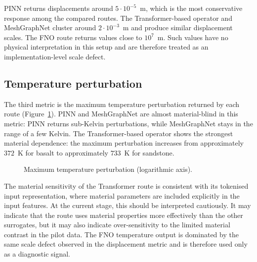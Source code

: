 PINN returns displacements around $5 \cdot 10^{-5}$~m, which is the most
conservative response among the compared routes. The Transformer-based
operator and MeshGraphNet cluster around $2 \cdot 10^{-3}$~m and produce
similar displacement scales. The FNO route returns values close to
$10^7$~m. Such values have no physical interpretation in this setup and
are therefore treated as an implementation-level scale defect.

\subsection{Temperature perturbation}

The third metric is the maximum temperature perturbation returned by
each route (Figure~\ref{fig:temperature}). PINN and MeshGraphNet are
almost material-blind in this metric: PINN returns sub-Kelvin
perturbations, while MeshGraphNet stays in the range of a few Kelvin.
The Transformer-based operator shows the strongest material dependence:
the maximum perturbation increases from approximately $372$~K for basalt
to approximately $733$~K for sandstone.

\begin{figure}[ht]
\centering
{}
\caption{Maximum temperature perturbation (logarithmic axis).}
\label{fig:temperature}
\end{figure}

The material sensitivity of the Transformer route is consistent with
its tokenised input representation, where material parameters are
included explicitly in the input features. At the current stage, this
should be interpreted cautiously. It may indicate that the route uses
material properties more effectively than the other surrogates, but it
may also indicate over-sensitivity to the limited material contrast in
the pilot data. The FNO temperature output is dominated by the same
scale defect observed in the displacement metric and is therefore used
only as a diagnostic signal.


